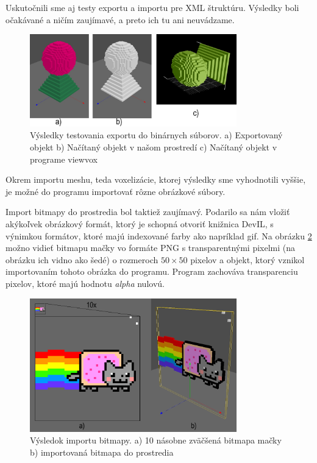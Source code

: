 Uskutočnili sme aj testy exportu a importu pre XML štruktúru. Výsledky boli očakávané a ničím zaujímavé, a preto ich tu ani neuvádzame.

\begin{figure}[!h]
	\centering
	\includegraphics[width=0.8\textwidth]{export.png}
	\caption[Test exportu]{Výsledky testovania exportu do binárnych súborov. a) Exportovaný objekt b) Načítaný objekt v našom prostredí c) Načítaný objekt v programe viewvox}
	\label{io}
\end{figure}
\eject

Okrem importu meshu, teda voxelizácie, ktorej výsledky sme vyhodnotili vyššie, je možné do programu importovať rôzne obrázkové súbory.
 
Import bitmapy do prostredia bol taktiež zaujímavý. Podarilo sa nám vložiť akýkoľvek obrázkový formát, ktorý je schopná otvoriť knižnica DevIL, s výnimkou formátov, ktoré majú indexované farby ako napríklad gif. Na obrázku \ref{obr:cat} možno vidieť bitmapu mačky vo formáte PNG s transparentnými pixelmi (na obrázku ich vidno ako šedé) o rozmeroch $50\times50$ pixelov a objekt, ktorý vznikol importovaním tohoto obrázka do programu. Program zachováva transparenciu pixelov, ktoré majú hodnotu \textit{alpha} nulovú.

\begin{figure}[!h]
	\centering
	\includegraphics[width=0.8\textwidth]{cat.png}
	\caption[Import bitmapy]{Výsledok importu bitmapy. a) 10 násobne zväčšená bitmapa mačky b) importovaná bitmapa do prostredia}
	\label{obr:cat}
\end{figure}

